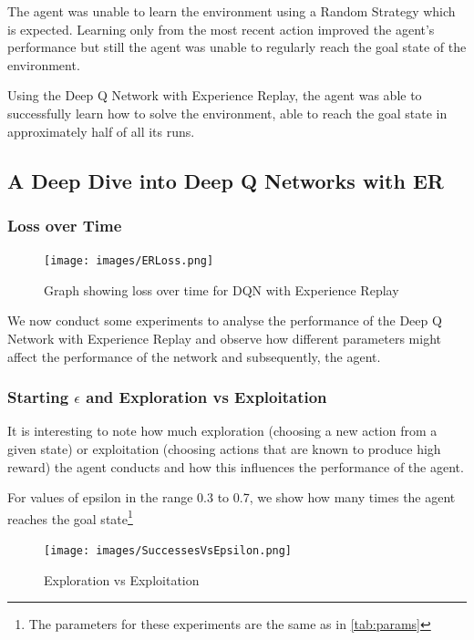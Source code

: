 \documentclass{article}
\begin{document}
The agent was unable to learn the environment using a Random Strategy which is expected. Learning only from the most recent action improved the agent's performance but still the agent was unable to regularly reach the goal state of the environment.

Using the Deep Q Network with Experience Replay, the agent was able to successfully learn how to solve the environment, able to reach the goal state in approximately half of all its runs.




\subsection{A Deep Dive into Deep Q Networks with ER}

\subsubsection{Loss over Time}

\begin{figure}[H]
    \centering
    \texttt{[image: images/ERLoss.png]}
    \caption{Graph showing loss over time for DQN with Experience Replay}
    \label{fig:ER Loss}
\end{figure}

We now conduct some experiments to analyse the performance of the Deep Q Network with Experience Replay and observe how different parameters might affect the performance of the network and subsequently, the agent.

\subsubsection{Starting $\epsilon$ and Exploration vs Exploitation}

It is interesting to note how much exploration (choosing a new action from a given state) or exploitation (choosing actions that are known to produce high reward) the agent conducts and how this influences the performance of the agent. 

For values of epsilon in the range 0.3 to 0.7, we show how many times the agent reaches the goal state\footnote{The parameters for these experiments are the same as in \ref{tab:params}}

\begin{figure}[H]
    \centering
    \texttt{[image: images/SuccessesVsEpsilon.png]}
    \caption{Exploration vs Exploitation}
    \label{fig:ExpExpSucc}
\end{figure}
\end{document}
